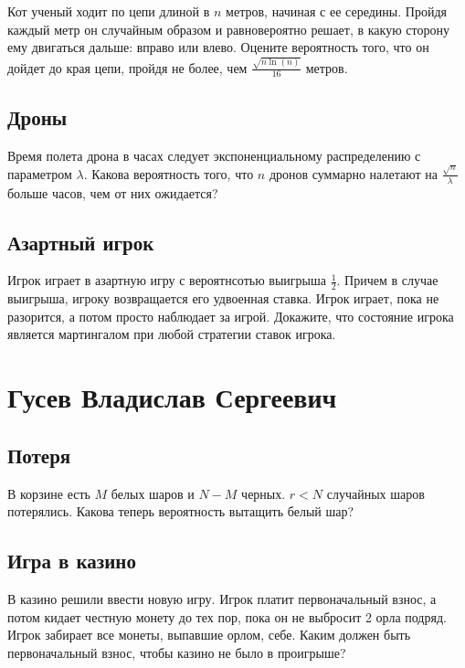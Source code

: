 \documentclass[12pt]{article}
\begin{document}
Кот ученый ходит по цепи длиной в $n$ метров, начиная с ее середины. Пройдя каждый метр он случайным образом и равновероятно решает, в какую сторону ему двигаться дальше: вправо или влево. Оцените вероятность того, что он дойдет до края цепи, пройдя не более, чем $\frac{\sqrt{n \ln(n)}}{16}$ метров.



\subsection{Дроны}

Время полета дрона в часах следует экспоненциальному распределению с параметром $\lambda$. Какова вероятность того, что $n$ дронов суммарно налетают на $\frac{\sqrt{n}}{\lambda}$ больше часов, чем от них ожидается?



\subsection{Азартный игрок}

Игрок играет в азартную игру с вероятнсотью выигрыша $\frac{1}{2}$. Причем в случае выигрыша, игроку возвращается его удвоенная ставка. Игрок играет, пока не разорится, а потом просто наблюдает за игрой. Докажите, что состояние игрока является мартингалом при любой стратегии ставок игрока.



\newpage
\section{Гусев Владислав Сергеевич}

\subsection{Потеря}

В корзине есть $M$ белых шаров и $N - M$ черных. $r < N$ случайных шаров потерялись. Какова теперь вероятность вытащить белый шар?



\subsection{Игра в казино}

В казино решили ввести новую игру. Игрок платит первоначальный взнос, а потом кидает честную монету до тех пор, пока он не выбросит 2 орла подряд. Игрок забирает все монеты, выпавшие орлом, себе. Каким должен быть первоначальный взнос, чтобы казино не было в проигрыше?
\end{document}
